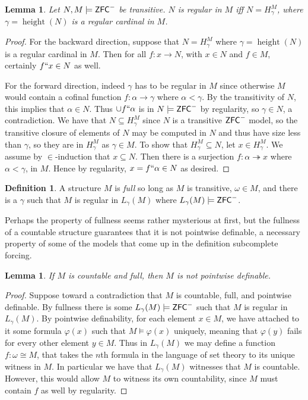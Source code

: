 \documentclass{amsart}
\newtheorem{lemma}[theorem]{Lemma}
\theoremstyle{definition}
\newtheorem{definition}[theorem]{Definition}
\theoremstyle{remark}
\newcommand{\ZFC}{\textup{\ensuremath{\textsf{ZFC}}}}
\DeclareMathOperator{\height}{height}
\begin{document}
\begin{lemma} \label{lemma:regularityequiv}
Let $N, M \models \ZFC^-$ be transitive. $N$ is regular in $M$ iff $N = H_\gamma^M$, where $\gamma = \height(N)$ is a regular cardinal in $M$. %
\end{lemma}
\begin{proof}
For the backward direction, suppose that $N=H_\gamma^M$ where $\gamma = \height(N)$ is a regular cardinal in $M$. Then for all $f: x \longrightarrow N$, with $x \in N$ and $f \in M$, certainly $f``x \in N$ as well.

For the forward direction, indeed $\gamma$ has to be regular in $M$ since otherwise $M$ would contain a cofinal function $f: \alpha \longrightarrow \gamma$ where $\alpha < \gamma$. By the transitivity of $N$, this implies that $\alpha \in N$. Thus $\cup f``\alpha$ is in $N \models \ZFC^-$ by regularity, so $\gamma \in N$, a contradiction.
We have that $N \subseteq H_{\gamma}^M$ since $N$ is a transitive $\ZFC^-$ model, so the transitive closure of elements of $N$ may be computed in $N$ and thus have size less than $\gamma$, so they are in $H_\gamma^M$ as $\gamma \in M$. To show that $H_{\gamma}^M \subseteq N$, let $x \in H_{\gamma}^M$. We assume by $\in$-induction that $x \subseteq N$. Then there is a surjection $f: \alpha \twoheadrightarrow x$ where $\alpha < \gamma$, in $M$. Hence by regularity, $x = f``\alpha \in N$ as desired.
\end{proof}

\begin{definition} A structure $M$ is \emph{full} so long as $M$ is transitive, $\omega \in M$, and there is a $\gamma$ such that $M$ is regular in $L_\gamma(M)$ where $L_\gamma(M) \models \ZFC^-$.
\end{definition}

Perhaps the property of fullness seems rather mysterious at first, but the fullness of a countable structure guarantees that it is not pointwise definable, a necessary property of some of the models that come up in the definition subcomplete forcing.

\begin{lemma} If $M$ is countable and full, then $M$ is not pointwise definable. \end{lemma}
\begin{proof} Suppose toward a contradiction that $M$ is countable, full, and pointwise definable. By fullness there is some $L_\gamma(M) \models \ZFC^-$ such that $M$ is regular in $L_\gamma(M)$. By pointwise definability, for each element $x \in M$, we have attached to it some formula $\varphi(x)$ such that $M \models \varphi(x)$ uniquely, meaning that $\varphi(y)$ fails for every other element $y \in M$. Thus in $L_\gamma(M)$ we may define a function $f: \omega \cong M$, that takes the $n$th formula in the language of set theory to its unique witness in $M$. In particular we have that $L_\gamma(M)$ witnesses that $M$ is countable. However, this would allow $M$ to witness its own countability, since $M$ must contain $f$ as well by regularity. \end{proof} 
\end{document}
